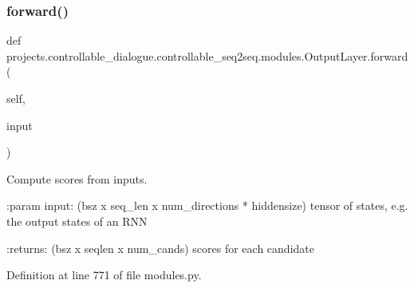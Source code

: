 \subsubsection{\texorpdfstring{forward()}{forward()}}
{\footnotesize\ttfamily def projects.\+controllable\+\_\+dialogue.\+controllable\+\_\+seq2seq.\+modules.\+Output\+Layer.\+forward (\begin{DoxyParamCaption}\item[{}]{self,  }\item[{}]{input }\end{DoxyParamCaption})}

\begin{DoxyVerb}Compute scores from inputs.

:param input: (bsz x seq_len x num_directions * hiddensize) tensor of
       states, e.g. the output states of an RNN

:returns: (bsz x seqlen x num_cands) scores for each candidate
\end{DoxyVerb}
 

Definition at line 771 of file modules.\+py.


